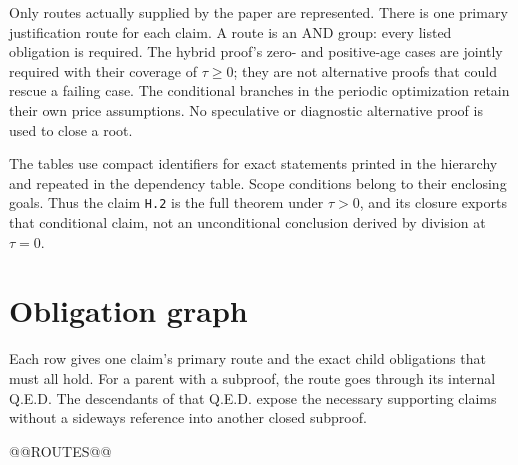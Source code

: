 \documentclass[11pt,letterpaper]{article}
\begin{document}
Only routes actually supplied by the paper are represented. There is one primary justification route for each claim. A route is an AND group: every listed obligation is required. The hybrid proof's zero- and positive-age cases are jointly required with their coverage of $\tau\ge0$; they are not alternative proofs that could rescue a failing case. The conditional branches in the periodic optimization retain their own price assumptions. No speculative or diagnostic alternative proof is used to close a root.

The tables use compact identifiers for exact statements printed in the hierarchy and repeated in the dependency table. Scope conditions belong to their enclosing goals. Thus the claim \texttt{H.2} is the full theorem under $\tau>0$, and its closure exports that conditional claim, not an unconditional conclusion derived by division at $\tau=0$.

\section{Obligation graph}
Each row gives one claim's primary route and the exact child obligations that must all hold. For a parent with a subproof, the route goes through its internal Q.E.D. The descendants of that Q.E.D. expose the necessary supporting claims without a sideways reference into another closed subproof.

{\footnotesize @@ROUTES@@}
\end{document}

